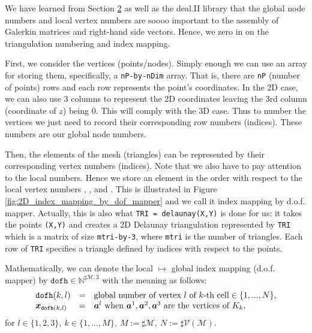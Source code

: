 	We have learned from Section \hyperref[section.2]{2} as well as the deal.II 
	library that the global node numbers and local vertex numbers are soooo
	important to the assembly of Galerkin matrices and right-hand side vectors.
	Hence, we zero in on the triangulation numbering and index mapping. 
	
	First, we consider the vertices (points/nodes). Simply enough we can use an 
	array for storing them, specifically, a \texttt{nP-by-nDim} array. That is,
	there are \texttt{nP} (number of points) rows and each row represents the 
	point's coordinates. In the 2D case, we can also use 3 columns to represent 
	the 2D coordinates leaving the 3rd column (coordinate of $z$) being 0. This 
	will comply with the 3D case. Thus to number the vertices we just need to 
	record their corresponding row numbers (indices). These numbers are 
	our global node numbers.
	
	Then, the elements of the mesh (triangles) can be represented by their
	corresponding vertex numbers (indices). Note that we also have to pay 
	attention to the local numbers. Hence we store an element in the order with 
	respect	to the local vertex numbers , , and 
	. This is illustrated in Figure 
	\ref{fig:2D_index_mapping_by_dof_mapper} and we call it index mapping by 
	d.o.f. mapper. Actually, this is also what \texttt{TRI = delaunay(X,Y)} is 
	done for us: it takes the points \texttt{(X,Y)} and creates a 2D Delaunay 
	triangulation represented by \texttt{TRI} which is a matrix of size 
	\texttt{mtri-by-3}, where \texttt{mtri} is the number of triangles. Each 
	row of \texttt{TRI} specifies a triangle defined by indices with respect to 
	the points.
	
	Mathematically, we can denote the local $\mapsto$ global index mapping 
	(d.o.f. mapper) by $\texttt{dofh}\in\mathbb{N}^{\sharp\mathcal{M},3}$
	with the meaning as follows:
	\begin{equation}\label{def:2D d.o.f. mapper dofh}
		\begin{array}{lll}
			\texttt{dofh}(k,l) & = & \textrm{global number of vertex } l 
			\textrm{ of } k\textrm{-th cell}\in \{1,...,N\},\\
			\bm{x}_{\texttt{dofh}(k,l)}&=&\bm{a}^l\textrm{ when }\bm{a}^1,\bm{a}^2,\bm{a}^3
			\textrm{ are the vertices of } K_k,
		\end{array}
	\end{equation}
	for $l\in\{1,2,3\},\ k\in\{1,...,M\},\ M:=\sharp\mathcal{M},\ 
		N:=\sharp\mathcal{V}(\mathcal{M})$.
			
